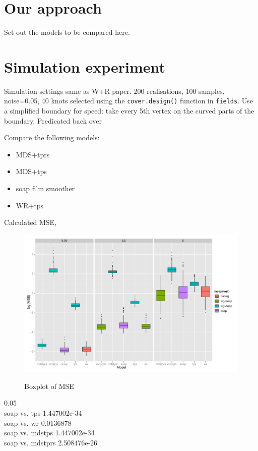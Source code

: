 \documentclass[10pt]{article}
\begin{document}
\section{Our approach}

Set out the models to be compared here.




\section{Simulation experiment}

Simulation settings same as W+R paper. 200 realisations, 100 samples, noise=0.05, 40 knots selected using the \texttt{cover.design()} function in \texttt{fields}. Use a simplified boundary for speed: take every 5th vertex on the curved parts of the boundary. Predicated back over 

Compare the following models:

\begin{itemize}
	\item MDS+tprs
	\item MDS+tps
	\item soap film smoother
	\item WR+tps
\end{itemize}

Calculated MSE, 

\begin{figure}
\centering
\includegraphics[width=6.5in]{figs/ramsim-mse.pdf}\\
\caption{Boxplot of MSE}
\label{ramsim-mse}
\end{figure}


0.05\\
soap vs.  tps 1.447002e-34 \\
soap vs.  wr 0.0136878 \\
soap vs.  mdstps 1.447002e-34 \\
soap vs.  mdstprs 2.508476e-26 \\
\end{document}
